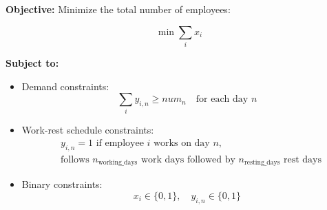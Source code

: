 \documentclass{article}
\begin{document}
\textbf{Objective:}
Minimize the total number of employees:

\[
\min \sum_{i} x_i
\]

\textbf{Subject to:}

\begin{itemize}
    \item Demand constraints:
    \[
    \sum_{i} y_{i,n} \geq num_n \quad \text{for each day } n
    \]

    \item Work-rest schedule constraints:
    \[
    \begin{aligned}
    & y_{i,n} = 1 \text{ if employee } i \text{ works on day } n, \\
    & \text{follows } n_{\text{working\_days}} \text{ work days followed by } n_{\text{resting\_days}} \text{ rest days} 
    \end{aligned}
    \]

    \item Binary constraints:
    \[
    x_i \in \{0, 1\}, \quad y_{i,n} \in \{0, 1\}
    \]
\end{itemize}
\end{document}
